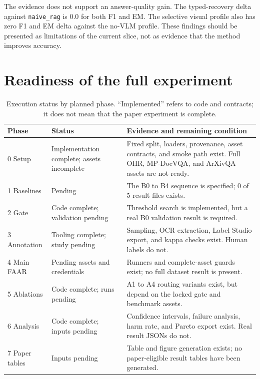 \documentclass[10pt,twocolumn]{article}
\begin{document}
The evidence does not support an answer-quality gain. The typed-recovery delta against \texttt{naive\_rag} is 0.0 for both F1 and EM. The selective visual profile also has zero F1 and EM delta against the no-VLM profile. These findings should be presented as limitations of the current slice, not as evidence that the method improves accuracy.

\section{Readiness of the full experiment}

\begin{table}[H]
\centering
\caption{Execution status by planned phase. ``Implemented'' refers to code and contracts; it does not mean that the paper experiment is complete.}
\label{tab:phases}
\scriptsize
\begin{tabularx}{\columnwidth}{@{}lL{0.25\columnwidth}Y@{}}
\toprule
Phase & Status & Evidence and remaining condition \\
 Setup & Implementation complete; assets incomplete & Fixed split, loaders, provenance, asset contracts, and smoke path exist. Full OHR, MP-DocVQA, and ArXivQA assets are not ready. \\
1 Baselines & Pending & The B0 to B4 sequence is specified; 0 of 5 result files exists. \\
2 Gate & Code complete; validation pending & Threshold search is implemented, but a real B0 validation result is required. \\
3 Annotation & Tooling complete; study pending & Sampling, OCR extraction, Label Studio export, and kappa checks exist. Human labels do not. \\
4 Main FAAR & Pending assets and credentials & Runners and complete-asset guards exist; no full dataset result is present. \\
5 Ablations & Code complete; runs pending & A1 to A4 routing variants exist, but depend on the locked gate and benchmark assets. \\
6 Analysis & Code complete; inputs pending & Confidence intervals, failure analysis, harm rate, and Pareto export exist. Real result JSONs do not. \\
7 Paper tables & Inputs pending & Table and figure generation exists; no paper-eligible result tables have been generated. \\
\bottomrule
\end{tabularx}
\end{table}
\end{document}
